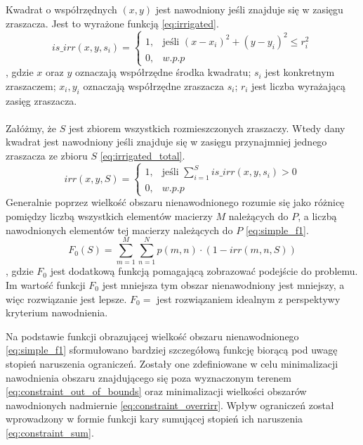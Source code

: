 \documentclass[twoside]{iisthesis}
\begin{document}
Kwadrat o współrzędnych $(x,y)$ jest nawodniony jeśli znajduje się w zasięgu zraszacza. Jest to wyrażone funkcją \eqref{eq:irrigated}.
\begin{equation}\label{eq:irrigated}
	is\_irr(x, y, s_{i}) = \begin{cases}
							1,& \text{jeśli } (x - x_{i})^{2} + (y - y_{i})^2 \leq r_{i}^{2}\\
							0,& w.p.p
						  \end{cases}
\end{equation}
, gdzie $x$ oraz $y$ oznaczają współrzędne środka kwadratu; $s_{i}$ jest konkretnym zraszaczem; $x_{i}, y_{i}$ oznaczają współrzędne zraszacza $s_{i}$; $r_{i}$ jest liczba wyrażającą zasięg zraszacza.\\\\
Załóżmy, że $S$ jest zbiorem wszystkich rozmieszczonych zraszaczy. Wtedy dany kwadrat jest nawodniony jeśli znajduje się w zasięgu przynajmniej jednego zraszacza ze zbioru $S$ \eqref{eq:irrigated_total}.
\begin{equation}\label{eq:irrigated_total}
	irr(x, y, S) = \begin{cases}
				   	1,& \text{jeśli } \sum_{i=1}^{S} is\_irr(x,y,s_{i}) > 0 \\
				   	0,& w.p.p			   	
				   \end{cases}
\end{equation}
Generalnie poprzez wielkość obszaru nienawodnionego rozumie się jako różnicę pomiędzy liczbą wszystkich elementów macierzy $M$ należących do $P$, a liczbą nawodnionych elementów tej macierzy należących do $P$ \eqref{eq:simple_f1}.
\begin{equation}\label{eq:simple_f1}
	F_{0}(S) = \sum_{m=1}^{M}\sum_{n=1}^{N} p(m,n) \cdot (1 - irr(m,n,S))
\end{equation}
, gdzie $F_{0}$ jest dodatkową funkcją pomagającą zobrazować podejście do problemu. Im wartość funkcji $F_{0}$ jest mniejsza tym obszar nienawodniony jest mniejszy, a więc rozwiązanie jest lepsze. $F_{0} = $ jest rozwiązaniem idealnym z perspektywy kryterium nawodnienia.


Na podstawie funkcji obrazującej wielkość obszaru nienawodnionego \eqref{eq:simple_f1} sformułowano bardziej szczegółową funkcję biorącą pod uwagę stopień naruszenia ograniczeń. Zostały one zdefiniowane w celu minimalizacji nawodnienia obszaru znajdującego się poza wyznaczonym terenem \eqref{eq:constraint_out_of_bounds} oraz minimalizacji wielkości obszarów nawodnionych nadmiernie \eqref{eq:constraint_overrirr}. Wpływ ograniczeń został wprowadzony w formie funkcji kary sumującej stopień ich naruszenia \eqref{eq:constraint_sum}.
\end{document}
